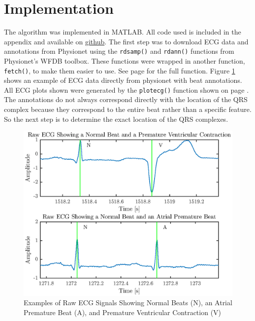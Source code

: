 \documentclass[titlepage,12pt,letter]{article}
\begin{document}
\section{Implementation}
The algorithm was implemented in MATLAB.  All code used is included in the
appendix and available on \href{https://github.com/robbystk/Arrythmias}{github}.
The first step was to download ECG data and annotations from Physionet using the
\verb`rdsamp()` and \verb`rdann()` functions from Physionet's WFDB toolbox.
These functions were wrapped in another function, \verb`fetch()`, to make them
easier to use.  See page \pageref{fun:fetch} for the full function.  Figure
\ref{fig:raw} shows an example of ECG data directly from physionet with beat
annotations.  All ECG plots shown were generated by the \verb`plotecg()`
function shown on page \pageref{fun:plotecg}.  The annotations do not always
correspond directly with the location of the QRS complex because they correspond
to the entire beat rather than a specific feature.  So the next step is to
determine the exact location of the QRS complexes.  

\begin{figure}[hbtp]
    \centering
    \includegraphics[height=0.42\textheight]{../figures/figures_01}
    \caption{Examples of Raw ECG Signals Showing Normal Beats (N), an Atrial
    Premature Beat (A), and Premature Ventricular Contraction (V)}
    \label{fig:raw}
\end{figure}
\end{document}
